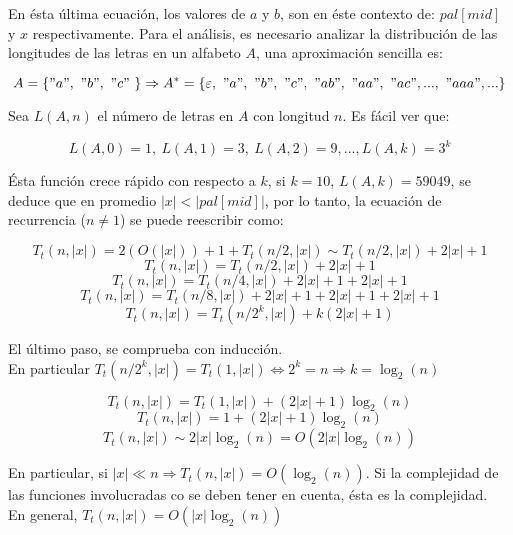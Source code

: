 \documentclass[11pt,spanish]{article}
\renewcommand{\epsilon}{\varepsilon}
\begin{document}
\begin{enumerate}
\begin{enumerate}
		En ésta última ecuación, los valores de $a$ y $b$, son en éste contexto de: $pal[mid]$ y $x$ respectivamente. Para el análisis, es necesario analizar la distribución de las longitudes de las letras en un alfabeto $A$, una aproximación sencilla es:
		
		$$A = \left\{ "a",\ "b",\ "c"\ \right\} \Rightarrow A^* = \left\{\epsilon,\ "a",\ "b",\ "c",\ "ab",\ "aa",\ "ac", ...,\ "aaa", ...  \right\}$$ 
		
		Sea $L(A, n)$ el número de letras en $A$ con longitud $n$. Es fácil ver que:
		
		$$L(A, 0) = 1,\ L(A, 1) = 3,\ L(A, 2) = 9, ..., L(A, k) = 3^k$$
		
		Ésta función crece rápido con respecto a $k$, si $k = 10$, $L(A, k) = 59049$, se deduce que en promedio $\left| x \right| < \left| pal[mid] \right|$, por lo tanto, la ecuación de recurrencia ($n \neq 1$) se puede reescribir como:
		
		\pagebreak
		
		$$T_{t}(n, \left| x \right|) = 2 \left( O(\left| x \right|) \right) + 1 + T_{t}(n / 2, \left| x \right|) \sim T_{t}(n / 2, \left| x \right|) + 2 \left| x \right| + 1$$
		$$T_{t}(n, \left| x \right|) =  T_{t}(n / 2, \left| x \right|) + 2 \left| x \right| + 1$$
		$$T_{t}(n, \left| x \right|) =  T_{t}(n / 4, \left| x \right|) + 2 \left| x \right| + 1+ 2 \left| x \right| + 1$$
		$$T_{t}(n, \left| x \right|) =  T_{t}(n / 8, \left| x \right|) + 2 \left| x \right| + 1+ 2 \left| x \right| + 1+ 2 \left| x \right| + 1$$
		$$T_{t}(n, \left| x \right|) =  T_{t}(n / 2^k, \left| x \right|) + k(2\left| x \right| + 1)$$
		
		El último paso, se comprueba con inducción. \\En particular $T_{t}(n / 2^k, \left| x \right|) = T_{t}(1, \left| x \right|) \iff 2^k = n \Rightarrow k = \log_{2}(n)$
		
		$$T_{t}(n, \left| x \right|) =  T_{t}(1, \left| x \right|) + (2\left| x \right| + 1)\log_{2}(n)$$
		$$T_{t}(n, \left| x \right|) =  1 + (2\left| x \right| + 1)\log_{2}(n)$$
		$$T_{t}(n, \left| x \right|) \sim  2\left| x \right|\log_{2}(n) = O(2\left| x \right|\log_{2}(n))$$
		
		En particular, si $\left| x \right| \ll n \Rightarrow T_{t}(n, \left| x \right|) = O(\log_{2}(n))$. Si la complejidad de las funciones involucradas co se deben tener en cuenta, ésta es la complejidad. \\En general, $T_{t}(n, \left| x \right|)  = O(\left| x \right|\log_{2}(n))$
		\\
		

\end{enumerate}
\end{enumerate}
\end{document}
